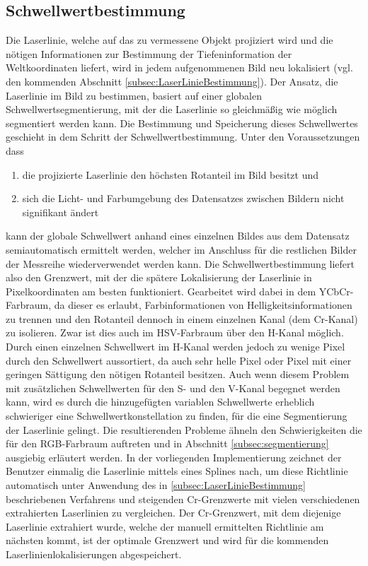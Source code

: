 \subsection{Schwellwertbestimmung}
\label{subsec:Farbkalibrierung}
Die Laserlinie, welche auf das zu vermessene Objekt projiziert wird und die nötigen Informationen zur Bestimmung der Tiefeninformation der Weltkoordinaten liefert, wird in jedem aufgenommenen Bild neu lokalisiert (vgl. den kommenden Abschnitt \ref{subsec:LaserLinieBestimmung}). Der Ansatz, die Laserlinie im Bild zu bestimmen, basiert auf einer globalen Schwellwertsegmentierung, mit der die Laserlinie so gleichmäßig wie möglich segmentiert werden kann. Die Bestimmung und Speicherung dieses Schwellwertes geschieht in dem Schritt der Schwellwertbestimmung. Unter den Voraussetzungen dass 
\begin{enumerate}
\item die projizierte Laserlinie den höchsten Rotanteil im Bild besitzt und 
\item sich die Licht- und Farbumgebung des Datensatzes zwischen Bildern nicht signifikant ändert
\end{enumerate} 
kann der globale Schwellwert anhand eines einzelnen Bildes aus dem Datensatz semiautomatisch ermittelt werden, welcher im Anschluss für die restlichen Bilder der Messreihe wiederverwendet werden kann.\newline
Die Schwellwertbestimmung liefert also den Grenzwert, mit der die spätere Lokalisierung der Laserlinie in Pixelkoordinaten am besten funktioniert. Gearbeitet wird dabei in dem YCbCr-Farbraum, da dieser es erlaubt, Farbinformationen von Helligkeitsinformationen zu trennen und den Rotanteil dennoch in einem einzelnen Kanal (dem Cr-Kanal) zu isolieren. Zwar ist dies auch im HSV-Farbraum über den H-Kanal möglich. Durch einen einzelnen Schwellwert im H-Kanal werden jedoch zu wenige Pixel durch den Schwellwert aussortiert, da auch sehr helle Pixel oder Pixel mit einer geringen Sättigung den nötigen Rotanteil besitzen. Auch wenn diesem Problem mit zusätzlichen Schwellwerten für den S- und den V-Kanal begegnet werden kann, wird es durch die hinzugefügten variablen Schwellwerte erheblich schwieriger eine Schwellwertkonstellation zu finden, für die eine Segmentierung der Laserlinie gelingt. Die resultierenden Probleme ähneln den Schwierigkeiten die für den RGB-Farbraum auftreten und in Abschnitt \ref{subsec:segmentierung} ausgiebig erläutert werden. In der vorliegenden Implementierung zeichnet der Benutzer einmalig die Laserlinie mittels eines Splines nach, um diese Richtlinie automatisch unter Anwendung des in \ref{subsec:LaserLinieBestimmung} beschriebenen Verfahrens und steigenden Cr-Grenzwerte mit vielen verschiedenen extrahierten Laserlinien zu vergleichen. Der Cr-Grenzwert, mit dem diejenige Laserlinie extrahiert wurde, welche der manuell ermittelten Richtlinie am nächsten kommt, ist der optimale Grenzwert und wird für die kommenden Laserlinienlokalisierungen abgespeichert.\newline
